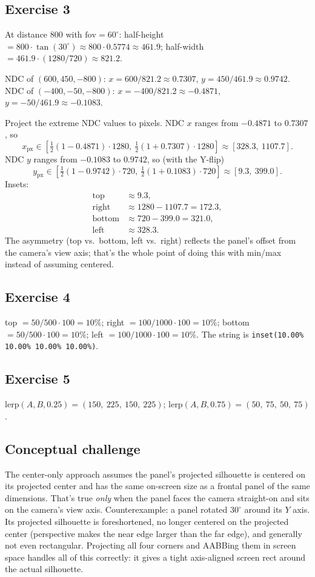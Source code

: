 \documentclass{article}
\begin{document}
\subsection*{Exercise 3}
At distance $800$ with $\mathrm{fov} = 60^\circ$:
half-height $= 800 \cdot \tan(30^\circ) \approx 800 \cdot 0.5774 \approx 461.9$;
half-width $= 461.9 \cdot (1280/720) \approx 821.2$.

NDC of $(600, 450, -800)$: $x = 600 / 821.2 \approx 0.7307$,
$y = 450 / 461.9 \approx 0.9742$.
NDC of $(-400, -50, -800)$: $x = -400 / 821.2 \approx -0.4871$,
$y = -50 / 461.9 \approx -0.1083$.

Project the extreme NDC values to pixels. NDC $x$ ranges from $-0.4871$ to $0.7307$, so
\[
  x_{\mathrm{px}} \in [\tfrac{1}{2}(1 - 0.4871) \cdot 1280,\ \tfrac{1}{2}(1 + 0.7307) \cdot 1280]
              \approx [328.3,\ 1107.7].
\]
NDC $y$ ranges from $-0.1083$ to $0.9742$, so (with the Y-flip)
\[
  y_{\mathrm{px}} \in [\tfrac{1}{2}(1 - 0.9742) \cdot 720,\ \tfrac{1}{2}(1 + 0.1083) \cdot 720]
              \approx [9.3,\ 399.0].
\]
Insets:
\begin{align*}
  \text{top}    &\approx 9.3, \\
  \text{right}  &\approx 1280 - 1107.7 = 172.3, \\
  \text{bottom} &\approx 720 - 399.0 = 321.0, \\
  \text{left}   &\approx 328.3.
\end{align*}
The asymmetry (top vs.\ bottom, left vs.\ right) reflects the panel's offset from the
camera's view axis; that's the whole point of doing this with min/max instead of
assuming centered.

\subsection*{Exercise 4}
top $= 50/500 \cdot 100 = 10\%$; right $= 100/1000 \cdot 100 = 10\%$;
bottom $= 50/500 \cdot 100 = 10\%$; left $= 100/1000 \cdot 100 = 10\%$.
The string is \texttt{inset(10.00\% 10.00\% 10.00\% 10.00\%)}.

\subsection*{Exercise 5}
$\mathrm{lerp}(A, B, 0.25) = (150,\ 225,\ 150,\ 225)$;
$\mathrm{lerp}(A, B, 0.75) = (50,\ 75,\ 50,\ 75)$.

\subsection*{Conceptual challenge}
The center-only approach assumes the panel's projected silhouette is centered on its
projected center and has the same on-screen size as a frontal panel of the same
dimensions. That's true \emph{only} when the panel faces the camera straight-on and
sits on the camera's view axis. Counterexample: a panel rotated $30^\circ$ around its
$Y$ axis. Its projected silhouette is foreshortened, no longer centered on the
projected center (perspective makes the near edge larger than the far edge), and
generally not even rectangular. Projecting all four corners and AABBing them in screen
space handles all of this correctly: it gives a tight axis-aligned screen rect around
the actual silhouette.
\end{document}

